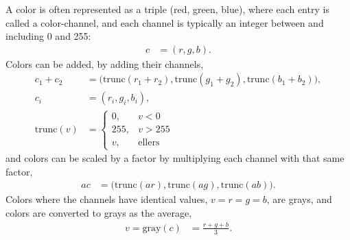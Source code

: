 A color is often represented as a triple (red, green, blue), where
each entry is called a color-channel, and each channel is typically an
integer between and including 0 and 255:
\begin{align}
  c &= (r, g,b).
\end{align}
Colors can be added, by adding their channels,
\begin{align}
  c_1 + c_2 &= \big(\text{trunc}(r_1+r_2), \text{trunc}(g_1+g_2), \text{trunc}(b_1+b_2)\big),
  \\c_i &= (r_i, g_i,b_i),
  \\\text{trunc}(v) &=
  \begin{cases}
    0, &v < 0
    \\255, &v > 255
    \\v, &\text{ellers}
  \end{cases}
\end{align}
and colors can be scaled by a factor by multiplying each channel with
that same factor,
\begin{align}
  a c &= \big(\text{trunc}(a r), \text{trunc}(a g), \text{trunc}(a b)\big).
\end{align}
Colors where the channels have identical values, $v=r=g=b$, are grays,
and colors are converted to grays as the average,
\begin{align}
  v = \text{gray}(c) &= \frac{r+g+b}{3}.
\end{align}
